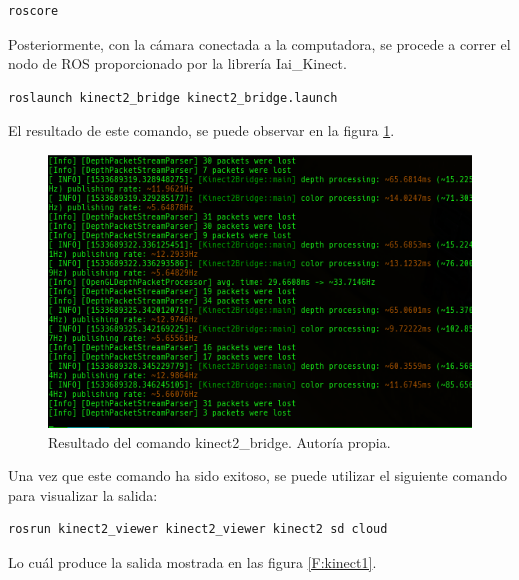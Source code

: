 \begin{lstlisting}
roscore
\end{lstlisting}

Posteriormente, con la cámara conectada a la computadora, se procede a correr el nodo de ROS proporcionado por la librería Iai\_Kinect.

\begin{lstlisting}
roslaunch kinect2_bridge kinect2_bridge.launch
\end{lstlisting}

El resultado de este comando, se puede observar en la figura \ref{F:kinectsalida}.

\begin{figure}[h!]
\centering
\includegraphics[scale=0.6]{imagenes/kinect_bridgesalida.png}
\caption{Resultado del comando kinect2\_bridge. Autoría propia.}
\label{F:kinectsalida}
\end{figure}

Una vez que este comando ha sido exitoso, se puede utilizar el siguiente comando para visualizar la salida:

\begin{lstlisting}
rosrun kinect2_viewer kinect2_viewer kinect2 sd cloud
\end{lstlisting}

Lo cuál produce la salida mostrada en las figura \ref{F:kinect1}.

